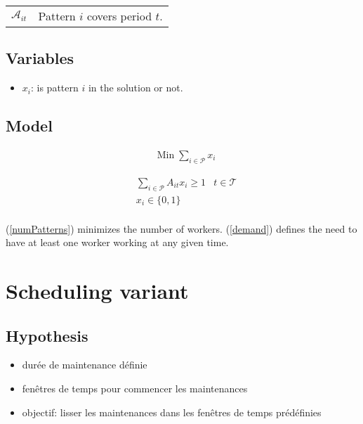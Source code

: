 \documentclass[a4paper,11pt]{article}
\begin{document}
    \begin{tabular}{ll}
        $\mathcal{A}_{it}$ & Pattern $i$ covers period $t$.\\
    \end{tabular}

    \vskip 0.3cm

    \subsection{Variables}

    \begin{itemize}
     \item $x_i$: is pattern $i$ in the solution or not.
    \end{itemize}

    \subsection{Model}

    \begin{align}
        & \text{Min}\; \sum_{i \in \mathcal{P}} x_i \label{numPatterns}
    \end{align}

    \begin{align}
        & \sum_{i \in \mathcal{P}} A_{it}x_{i} \geq 1 & t \in \mathcal{T} \label{demand} \\
        & x_{i} \in \{0, 1\} \\
    \end{align}

    (\ref{numPatterns}) minimizes the number of workers. (\ref{demand}) defines the need to have at least one worker working at any given time.  

\clearpage

\section{Scheduling variant}

    \subsection{Hypothesis}

    \begin{itemize}
     \item durée de maintenance définie
     \item fenêtres de temps pour commencer les maintenances
     \item objectif: lisser les maintenances dans les fenêtres de temps prédéfinies
    \end{itemize}
\end{document}
